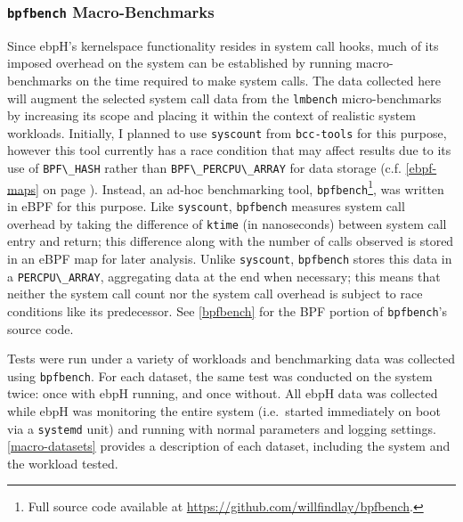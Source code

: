 \documentclass[
  12pt]{findlay}
\newcommand{\passthrough}[1]{#1}
\begin{document}
\hypertarget{bpfbench-macro-benchmarks}{%
\subsubsection{\texorpdfstring{\texttt{bpfbench}
Macro-Benchmarks}{bpfbench Macro-Benchmarks}}\label{bpfbench-macro-benchmarks}}

Since ebpH's kernelspace functionality resides in system call hooks,
much of its imposed overhead on the system can be established by running
macro-benchmarks on the time required to make system calls. The data
collected here will augment the selected system call data from the
\passthrough{\lstinline!lmbench!} micro-benchmarks by increasing its
scope and placing it within the context of realistic system workloads.
Initially, I planned to use \passthrough{\lstinline!syscount!}
\autocite{syscount} from \passthrough{\lstinline!bcc-tools!} for this
purpose, however this tool currently has a race condition that may
affect results due to its use of \passthrough{\lstinline!BPF\_HASH!}
rather than \passthrough{\lstinline!BPF\_PERCPU\_ARRAY!} for data
storage (c.f. \autoref{ebpf-maps} on page \pageref{ebpf-maps}). Instead,
an ad-hoc benchmarking tool,
\passthrough{\lstinline!bpfbench!}\footnote{Full source code available at
\url{https://github.com/willfindlay/bpfbench}.}, was written in eBPF for
this purpose. Like \texttt{syscount}, \passthrough{\lstinline!bpfbench!}
measures system call overhead by taking the difference of
\passthrough{\lstinline!ktime!} (in nanoseconds) between system call
entry and return; this difference along with the number of calls
observed is stored in an eBPF map for later analysis. Unlike
\passthrough{\lstinline!syscount!}, \passthrough{\lstinline!bpfbench!}
stores this data in a \passthrough{\lstinline!PERCPU\_ARRAY!},
aggregating data at the end when necessary; this means that neither the
system call count nor the system call overhead is subject to race
conditions like its predecessor. See \autoref{bpfbench} for the BPF
portion of \passthrough{\lstinline!bpfbench!}'s source code.

Tests were run under a variety of workloads and benchmarking data was
collected using \passthrough{\lstinline!bpfbench!}. For each dataset,
the same test was conducted on the system twice: once with ebpH running,
and once without. All ebpH data was collected while ebpH was monitoring
the entire system (i.e.~started immediately on boot via a
\passthrough{\lstinline!systemd!} unit) and running with normal
parameters and logging settings. \autoref{macro-datasets} provides a
description of each dataset, including the system and the workload
tested.
\end{document}
